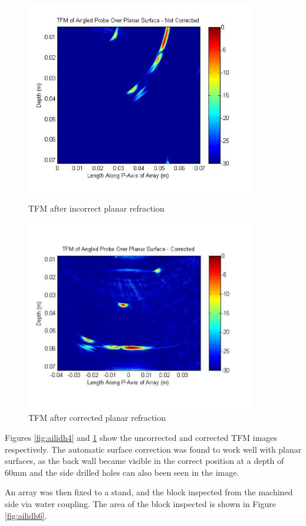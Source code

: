 \begin{figure}[htbp!]
\centering
		\includegraphics[width=100mm]{ailidh4.png}
		\caption{TFM after incorrect planar refraction}
		\label{fig:ailidh4}

		\includegraphics[width=100mm]{ailidh5.png}
		\caption{TFM after corrected planar refraction}
		\label{fig:ailidh5}
\end{figure}

Figures \ref{fig:ailidh4} and \ref{fig:ailidh5} show the uncorrected and corrected TFM images respectively. The automatic surface correction was found to work well with planar surfaces, as the back wall became visible in the correct position at a depth of 60mm and the side drilled holes can also been seen in the image.

An array was then fixed to a stand, and the block inspected from the machined side via water coupling. The area of the block inspected is shown in Figure \ref{fig:ailidh6}.

